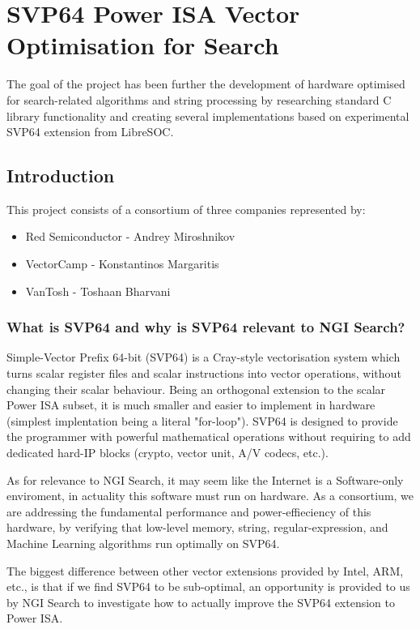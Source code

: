\chapter{SVP64 Power ISA Vector Optimisation for Search}

The goal of the project has been further the development of hardware
optimised for search-related algorithms and string processing by
researching standard C library functionality and creating several
implementations based on experimental SVP64 extension from LibreSOC.

\section{Introduction}

This project consists of a consortium of three companies represented by:

\begin{itemize}
  \item Red Semiconductor - Andrey Miroshnikov
  \item VectorCamp - Konstantinos Margaritis
  \item VanTosh - Toshaan Bharvani
\end{itemize}

\subsection{What is SVP64 and why is SVP64 relevant to NGI Search?}

Simple-Vector Prefix 64-bit (SVP64) is a Cray-style vectorisation system which
turns scalar register files and scalar instructions into vector operations,
without changing their scalar behaviour. Being an orthogonal extension to the
scalar Power ISA subset, it is much smaller and easier to implement in
hardware (simplest implentation being a literal "for-loop"). SVP64 is
designed to provide the programmer with powerful mathematical operations
without requiring to add dedicated hard-IP blocks (crypto, vector unit, A/V
codecs, etc.).

As for relevance to NGI Search, it may seem like the Internet is a
Software-only enviroment, in actuality this software must run on hardware.
As a consortium, we are addressing the fundamental performance and
power-effieciency of this hardware, by verifying that low-level memory,
string, regular-expression, and Machine Learning algorithms run optimally
on SVP64.

The biggest difference between other vector extensions provided by Intel,
ARM, etc., is that if we find SVP64 to be sub-optimal, an opportunity is
provided to us by NGI Search to investigate how to actually improve the
SVP64 extension to Power ISA.

